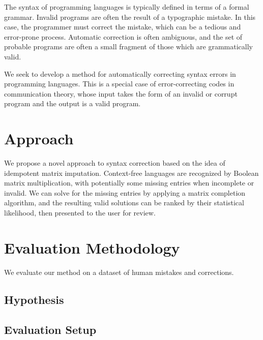 \documentclass[sigplan,screen]{acmart}
\begin{document}
The syntax of programming languages is typically defined in terms of a formal grammar. Invalid programs are often the result of a typographic mistake. In this case, the programmer must correct the mistake, which can be a tedious and error-prone process. Automatic correction is often ambiguous, and the set of probable programs are often a small fragment of those which are grammatically valid.

We seek to develop a method for automatically correcting syntax errors in programming languages. This is a special case of error-correcting codes in communication theory, whose input takes the form of an invalid or corrupt program and the output is a valid program.

\section{Approach}


We propose a novel approach to syntax correction based on the idea of idempotent matrix imputation. Context-free languages are recognized by Boolean matrix multiplication, with potentially some missing entries when incomplete or invalid. We can solve for the missing entries by applying a matrix completion algorithm, and the resulting valid solutions can be ranked by their statistical likelihood, then presented to the user for review.

\section{Evaluation Methodology}


We evaluate our method on a dataset of human mistakes and corrections.

\subsection{Hypothesis}


\subsection{Evaluation Setup}




\end{document}
